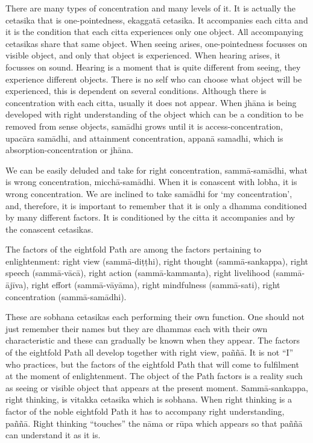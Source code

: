 There are many types of concentration and many levels of it. It is
actually the cetasika that is one-pointedness, ekaggatā cetasika. It
accompanies each citta and it is the condition that each citta
experiences only one object. All accompanying cetasikas share that same
object. When seeing arises, one-pointedness focusses on visible object,
and only that object is experienced. When hearing arises, it focusses on
sound. Hearing is a moment that is quite different from seeing, they
experience different objects. There is no self who can choose what
object will be experienced, this is dependent on several conditions.
Although there is concentration with each citta, usually it does not
appear. When jhāna is being developed with right understanding of the
object which can be a condition to be removed from sense objects,
samādhi grows until it is access-concentration, upacāra samādhi, and
attainment concentration, appanā samadhi, which is
absorption-concentration or jhāna.

We can be easily deluded and take for right concentration,
sammā-samādhi, what is wrong concentration, micchā-samādhi. When it is
conascent with lobha, it is wrong concentration. We are inclined to take
samādhi for `my concentration', and, therefore, it is important to
remember that it is only a dhamma conditioned by many different factors.
It is conditioned by the citta it accompanies and by the conascent
cetasikas.

The factors of the eightfold Path are among the factors pertaining to
enlightenment: right view (sammā-diṭṭhi), right thought
(sammā-sankappa), right speech (sammā-vācā), right action
(sammā-kammanta), right livelihood (sammā-ājīva), right effort
(sammā-vāyāma), right mindfulness (sammā-sati), right concentration
(sammā-samādhi).

These are sobhana cetasikas each performing their own function. One
should not just remember their names but they are dhammas each with
their own characteristic and these can gradually be known when they
appear. The factors of the eightfold Path all develop together with
right view, paññā. It is not ``I'' who practices, but the factors of the
eightfold Path that will come to fulfilment at the moment of
enlightenment. The object of the Path factors is a reality such as
seeing or visible object that appears at the present moment.
Sammā-sankappa, right thinking, is vitakka cetasika which is sobhana.
When right thinking is a factor of the noble eightfold Path it has to
accompany right understanding, paññā. Right thinking ``touches'' the
nāma or rūpa which appears so that paññā can understand it as it is.

